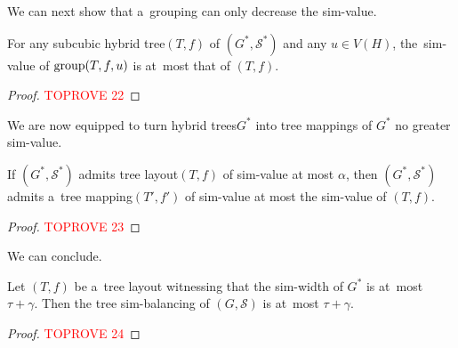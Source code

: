 \documentclass[a4paper,UKenglish,cleveref,hyperref,autoref]{lipics-v2021}
\newcommand{\tmap}{tree mapping\xspace}
\newcommand{\tmaps}{tree mappings\xspace}
\newcommand{\htree}{hybrid tree\xspace}
\newcommand{\htrees}{hybrid trees\xspace}
\begin{document}
We can next show that a~grouping can only decrease the sim-value. 

\begin{lemma}\label{lem:dec-sim-value}
For any subcubic \htree $(T, f)$ of $(G^*, \mathcal S^*)$ and any $u \in V(H)$, the~sim-value of $\text{group}(T, f, u)$ is at~most that of $(T, f)$.
\end{lemma}
\begin{proof}\textcolor{red}{TOPROVE 22}\end{proof}

We are now equipped to turn \htrees $G^*$ into \tmaps of $G^*$ no greater sim-value.



\begin{lemma}\label{lem:htree-to-tmap}
  If  $(G^*, \mathcal S^*)$ admits tree layout$(T,f)$ of sim-value at most $\alpha$, then $(G^*, \mathcal S^*)$ admits a~\tmap $(T',f')$ of sim-value at most the sim-value of $(T,f)$.
\end{lemma}
\begin{proof}\textcolor{red}{TOPROVE 23}\end{proof}

We can conclude.

\begin{lemma}
  Let $(T, f)$ be a~tree layout witnessing that the sim-width of $G^*$ is at~most~$\tau+\gamma$.
  Then the tree sim-balancing of $(G,\mathcal S)$ is at~most $\tau+\gamma$.
\end{lemma}
\begin{proof}\textcolor{red}{TOPROVE 24}\end{proof}

% 
\end{document}

